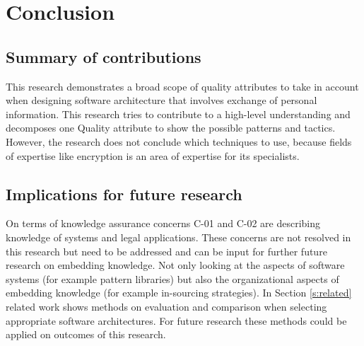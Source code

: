 \chapter{Conclusion}\label{s:conclusion}
\section{Summary of contributions}
This research demonstrates a broad scope of quality attributes to take in account when designing software architecture that involves exchange of personal information. This research tries to contribute to a high-level understanding and decomposes one Quality attribute to show the possible patterns and tactics. However, the research does not conclude which techniques to use, because fields of expertise like encryption is an area of expertise for its specialists.

\section{Implications for future research}\label{Implications}
On terms of knowledge assurance concerns C-01 and C-02 are describing knowledge of systems and legal applications. These concerns are not resolved in this research but need to be addressed and can be input for further future research on embedding knowledge. Not only looking at the aspects of software systems (for example pattern libraries) but also the organizational aspects of embedding knowledge (for example in-sourcing strategies). 
In Section \ref{s:related} related work shows methods on evaluation and comparison when selecting appropriate software architectures. For future research these methods could be applied on outcomes of this research.

